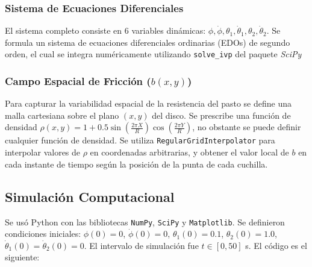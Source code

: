 \documentclass[12pt]{article}
\begin{document}
\subsubsection{Sistema de Ecuaciones Diferenciales}
El sistema completo consiste en 6 variables dinámicas: $\phi, \dot{\phi}, \theta_1, \dot{\theta}_1, \theta_2, \dot{\theta}_2$. Se formula un sistema de ecuaciones diferenciales ordinarias (EDOs) de segundo orden, el cual se integra numéricamente utilizando \texttt{solve\_ivp} del paquete \textit{SciPy}

\subsubsection{Campo Espacial de Fricción ($b(x,y)$)}
Para capturar la variabilidad espacial de la resistencia del pasto se define una malla cartesiana sobre el plano $(x, y)$ del disco. Se prescribe una función de densidad $\rho(x, y) = 1 + 0.5 \sin\left(\frac{2\pi X}{R}\right) \cos\left(\frac{2\pi Y}{R}\right)$, no obstante se puede definir cualquier función de densidad. Se utiliza \texttt{RegularGridInterpolator} para interpolar valores de $\rho$ en coordenadas arbitrarias, y obtener el valor local de $b$ en cada instante de tiempo según la posición de la punta de cada cuchilla.

\subsection{ Simulación Computacional}
Se usó Python con las bibliotecas \texttt{NumPy}, \texttt{SciPy} y \texttt{Matplotlib}. Se definieron condiciones iniciales: $\phi(0) = 0$, $\dot{\phi}(0) = 0$, $\theta_1(0) = 0.1$, $\theta_2(0) = 1.0$, $\dot{\theta}_1(0) = \dot{\theta}_2(0) = 0$. El intervalo de simulación fue $t \in [0, 50]$ s. El código es el siguiente:
\end{document}
